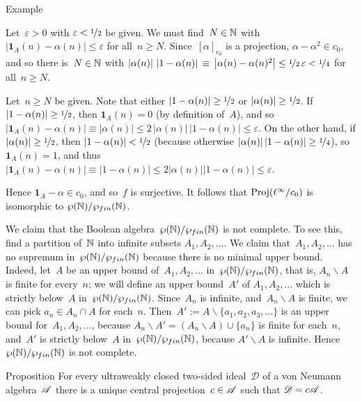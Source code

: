 \documentclass[main]{subfiles}
\begin{document}
\begin{parsec}
\begin{point}{Example}
\begin{point}
Let~$\varepsilon>0$ with $\varepsilon<\nicefrac{1}{2}$ be given.
We must find~$N\in\mathbb{N}$ with 
$\left| \mathbf{1}_A(n)-\alpha(n)\right|\leq \varepsilon$
for all~$n\geq N$.
Since~$[\alpha]_{c_0}$ is a projection,
$\alpha-\alpha^2\in c_0$,
and so
there is~$N\in \mathbb{N}$
with $\left|\alpha(n)\right| \,\left| 1-\alpha(n)\right|
\,\equiv\, \left| \alpha(n) - \alpha(n)^2 \right| \leq 
\nicefrac{1}{2}\,\varepsilon < \nicefrac{1}{4}$
for all~$n\geq N$.

Let~$n\geq N$ be given.
Note that either 
$\left|1-\alpha(n)\right|\geq \nicefrac{1}{2}$
or 
$\left|\alpha(n)\right|\geq \nicefrac{1}{2}$.
If~$\left|1-\alpha(n)\right|\geq\nicefrac{1}{2}$,
then $\mathbf{1}_A(n)=0$
(by definition of~$A$),
and so $\left|\mathbf{1}_A(n)-\alpha(n)\right|\equiv \left|\alpha(n)\right| 
\leq 2 \,\left|\alpha(n)\right|\,\left| 1-\alpha(n)\right|
\leq \varepsilon$.
On the other hand,
if  $\left|\alpha(n)\right| \geq \nicefrac{1}{2}$,
then $\left|1-\alpha(n)\right| < \nicefrac{1}{2}$
(because otherwise $\left|\alpha(n)\right|\left|1-\alpha(n)\right|
\geq \nicefrac{1}{4}$),
so $\mathbf{1}_A(n)=1$,
and thus
$\left|\mathbf{1}_A(n)-\alpha(n)\right|
\equiv \left|1-\alpha(n)\right|
\leq 2 \left|\alpha(n)\right|\left|1-\alpha(n)\right|
\leq \varepsilon$.

Hence $\mathbf{1}_A - \alpha \in c_0$,
and so~$f$ is surjective.
It follows that $\operatorname{Proj}(\ell^\infty/c_0)$
is isomorphic to $\wp(\mathbb{N})/\wp_{fin}(\mathbb{N})$.
\end{point}
\begin{point}%
We claim that the Boolean algebra~$\wp(\mathbb{N})/\wp_{fin}(\mathbb{N})$
is not complete.
To see this,
find a partition of~$\mathbb{N}$ into infinite subsets
$A_1,A_2,\dotsc$.
We claim that~$A_1,A_2,\dotsc$ has no supremum in~$\wp(\mathbb{N})/\wp_{fin}(\mathbb{N})$
because there is no minimal upper bound.
Indeed,
let~$A$ be an upper bound of~$A_1,A_2,\dotsc$ in~$\wp(\mathbb{N})/\wp_{fin}(\mathbb{N})$,
that is, $A_n\backslash A$ is finite for every~$n$;
we will define an upper bound~$A'$ of $A_1,A_2,\dotsc$
which is strictly below~$A$ in~$\wp(\mathbb{N})/\wp_{fin}(\mathbb{N})$.
Since~$A_n$ is infinite,
and~$A_n\backslash A$ is finite,
we can pick $a_n\in A_n\cap A$ for each~$n$.
Then~$A':=A \backslash \{a_1,a_2,a_3,\dotsc\}$
is an upper bound for~$A_1,A_2,\dotsc$,
because $A_n\backslash A' = (A_n\backslash A)\cup\{a_n\}$ is finite
for each~$n$,
and~$A'$ is strictly below~$A$ in~$\wp(\mathbb{N})/\wp_{fin}(\mathbb{N})$,
because $A'\backslash A$ is infinite.
Hence~$\wp(\mathbb{N})/\wp_{fin}(\mathbb{N})$
is not complete.
\end{point}
\begin{point}%
\end{point}
\end{point}
\begin{point}{Proposition}%
\label{prop:weakly-closed-ideal}
For every ultraweakly closed two-sided
ideal~$\mathscr{D}$ of a von Neumann algebra~$\mathscr{A}$
there is a unique central projection~$c\in\mathscr{A}$
such that $\mathscr{D} = c\mathscr{A}$.


\end{point}
\end{parsec}
\end{document}
